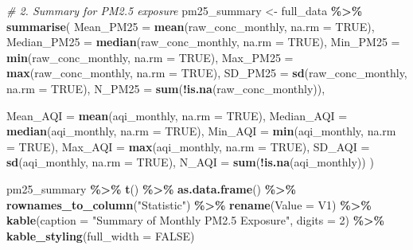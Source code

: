 \documentclass[
]{article}
\newenvironment{Shaded}{\begin{snugshade}}{\end{snugshade}}
\newcommand{\AttributeTok}[1]{\textcolor[rgb]{0.13,0.29,0.53}{#1}}
\newcommand{\CommentTok}[1]{\textcolor[rgb]{0.56,0.35,0.01}{\textit{#1}}}
\newcommand{\ConstantTok}[1]{\textcolor[rgb]{0.56,0.35,0.01}{#1}}
\newcommand{\DecValTok}[1]{\textcolor[rgb]{0.00,0.00,0.81}{#1}}
\newcommand{\FunctionTok}[1]{\textcolor[rgb]{0.13,0.29,0.53}{\textbf{#1}}}
\newcommand{\NormalTok}[1]{#1}
\newcommand{\OtherTok}[1]{\textcolor[rgb]{0.56,0.35,0.01}{#1}}
\newcommand{\SpecialCharTok}[1]{\textcolor[rgb]{0.81,0.36,0.00}{\textbf{#1}}}
\newcommand{\StringTok}[1]{\textcolor[rgb]{0.31,0.60,0.02}{#1}}
\begin{document}
\begin{Shaded}
\begin{Highlighting}[]
\CommentTok{\# 2. Summary for PM2.5 exposure}
\NormalTok{pm25\_summary }\OtherTok{\textless{}{-}}\NormalTok{ full\_data }\SpecialCharTok{\%\textgreater{}\%}
  \FunctionTok{summarise}\NormalTok{(}
    \AttributeTok{Mean\_PM25     =} \FunctionTok{mean}\NormalTok{(raw\_conc\_monthly, }\AttributeTok{na.rm =} \ConstantTok{TRUE}\NormalTok{),}
    \AttributeTok{Median\_PM25   =} \FunctionTok{median}\NormalTok{(raw\_conc\_monthly, }\AttributeTok{na.rm =} \ConstantTok{TRUE}\NormalTok{),}
    \AttributeTok{Min\_PM25      =} \FunctionTok{min}\NormalTok{(raw\_conc\_monthly, }\AttributeTok{na.rm =} \ConstantTok{TRUE}\NormalTok{),}
    \AttributeTok{Max\_PM25      =} \FunctionTok{max}\NormalTok{(raw\_conc\_monthly, }\AttributeTok{na.rm =} \ConstantTok{TRUE}\NormalTok{),}
    \AttributeTok{SD\_PM25       =} \FunctionTok{sd}\NormalTok{(raw\_conc\_monthly, }\AttributeTok{na.rm =} \ConstantTok{TRUE}\NormalTok{),}
    \AttributeTok{N\_PM25        =} \FunctionTok{sum}\NormalTok{(}\SpecialCharTok{!}\FunctionTok{is.na}\NormalTok{(raw\_conc\_monthly)),}

    \AttributeTok{Mean\_AQI      =} \FunctionTok{mean}\NormalTok{(aqi\_monthly, }\AttributeTok{na.rm =} \ConstantTok{TRUE}\NormalTok{),}
    \AttributeTok{Median\_AQI    =} \FunctionTok{median}\NormalTok{(aqi\_monthly, }\AttributeTok{na.rm =} \ConstantTok{TRUE}\NormalTok{),}
    \AttributeTok{Min\_AQI       =} \FunctionTok{min}\NormalTok{(aqi\_monthly, }\AttributeTok{na.rm =} \ConstantTok{TRUE}\NormalTok{),}
    \AttributeTok{Max\_AQI       =} \FunctionTok{max}\NormalTok{(aqi\_monthly, }\AttributeTok{na.rm =} \ConstantTok{TRUE}\NormalTok{),}
    \AttributeTok{SD\_AQI        =} \FunctionTok{sd}\NormalTok{(aqi\_monthly, }\AttributeTok{na.rm =} \ConstantTok{TRUE}\NormalTok{),}
    \AttributeTok{N\_AQI         =} \FunctionTok{sum}\NormalTok{(}\SpecialCharTok{!}\FunctionTok{is.na}\NormalTok{(aqi\_monthly))}
\NormalTok{  )}

\NormalTok{pm25\_summary }\SpecialCharTok{\%\textgreater{}\%}
  \FunctionTok{t}\NormalTok{() }\SpecialCharTok{\%\textgreater{}\%} \FunctionTok{as.data.frame}\NormalTok{() }\SpecialCharTok{\%\textgreater{}\%}
  \FunctionTok{rownames\_to\_column}\NormalTok{(}\StringTok{"Statistic"}\NormalTok{) }\SpecialCharTok{\%\textgreater{}\%}
  \FunctionTok{rename}\NormalTok{(}\AttributeTok{Value =}\NormalTok{ V1) }\SpecialCharTok{\%\textgreater{}\%}
  \FunctionTok{kable}\NormalTok{(}\AttributeTok{caption =} \StringTok{"Summary of Monthly PM2.5 Exposure"}\NormalTok{, }\AttributeTok{digits =} \DecValTok{2}\NormalTok{) }\SpecialCharTok{\%\textgreater{}\%}
  \FunctionTok{kable\_styling}\NormalTok{(}\AttributeTok{full\_width =} \ConstantTok{FALSE}\NormalTok{)}
\end{Highlighting}
\end{Shaded}
\end{document}
